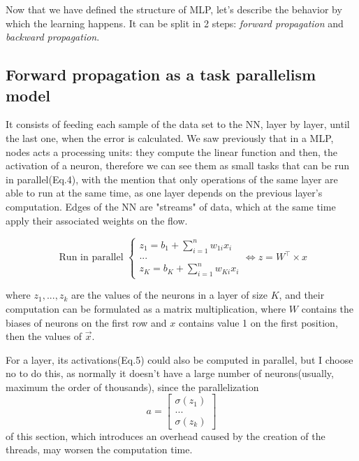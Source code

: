 \documentclass{article}
\begin{document}
	
	Now that we have defined the structure of MLP, let's describe the behavior by which the learning happens. It can be split in 2 steps: \textit{forward propagation} and \textit{backward propagation}.\\
	
	
	
	\subsection{Forward propagation as a task parallelism model}
	It consists of feeding each sample of the data set to the NN, layer by layer, until the last one, when the error is calculated. We saw previously that in a MLP, nodes acts a processing units: they compute the linear function and then, the activation of a neuron, therefore we can see them as small tasks that can be run in parallel(Eq.4), with the mention that only operations of the same layer are able to run at the same time, as one layer depends on the previous layer's computation. Edges of the NN are "streams" of data, which at the same time apply their associated weights on the flow.
	
	\begin{equation}
		\text{	Run in parallel }
		\begin{cases}
			z_1 = b_1 + \sum_{i=1}^{n}w_{1i}x_i \\
			...\\
			z_K = b_K + \sum_{i=1}^{n}w_{Ki}x_i 
		\end{cases}       
		\iff z = W^\top \times x	
	\end{equation}
	
	where $z_1, ..., z_k$ are the values of the neurons in a layer of size $K$, and their computation can be formulated as a matrix multiplication, where $W$ contains the biases of neurons on the first row and $x$ contains value 1 on the first position, then the values of $\vec{x}$.
	
	For a layer, its activations(Eq.5) could also be computed in parallel, but I choose no to do this, as normally it doesn't have a large number of 
	neurons(usually, maximum the order of thousands), since the parallelization
	\begin{equation}
		a = 
		\begin{bmatrix}
			\sigma(z_1)  \\
			...  \\
			\sigma(z_k)
		\end{bmatrix}
	\end{equation} of this section, which introduces an overhead caused by the creation of the threads, may worsen the computation time. 
	
\end{document}
